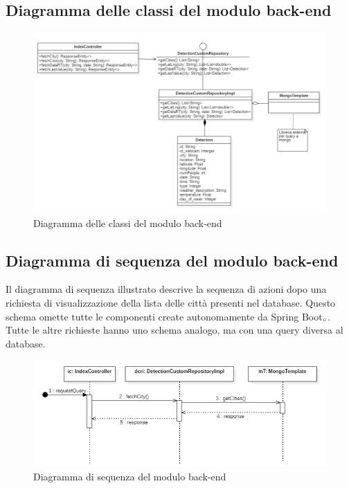\subsection{Diagramma delle classi del modulo back-end}\label{DiagrammaClassiRestApi}
\begin{center}
	\begin{figure}[H]
		\centering\includegraphics[scale=0.65]{../immagini/diag_PB/diag_class_spring.png}
		\caption{Diagramma delle classi del modulo back-end}
	\end{figure}
\end{center}
\subsection{Diagramma di sequenza del modulo back-end}\label{DiagrammaSequenzaSpring}
Il diagramma di sequenza illustrato descrive la sequenza di azioni dopo una richiesta di visualizzazione della lista delle città presenti nel database. Questo schema omette tutte le componenti create autonomamente da Spring Boot$_{\scaleto{G}{3pt}}$. Tutte le altre richieste hanno uno schema analogo, ma con una query diversa al database.
\begin{center}
	\begin{figure}[H]
		\centering\includegraphics[scale=0.7]{../immagini/diag_PB/diag_seq_spring.png}
		\caption{Diagramma di sequenza del modulo back-end}
	\end{figure}
\end{center}
